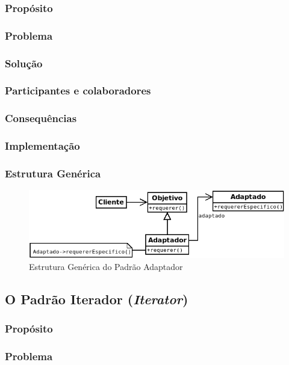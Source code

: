 \subsubsection{Propósito}
\subsubsection{Problema}
\subsubsection{Solução}
\subsubsection{Participantes e colaboradores}
\subsubsection{Consequências}
\subsubsection{Implementação}
\subsubsection{Estrutura Genérica}

\begin{figure}[h]
\begin{center}
\includegraphics[scale=0.6]{dp_adaptador.png}
\caption{Estrutura Genérica do Padrão Adaptador}\label{fig:adaptador}
\end{center}
\end{figure}

\subsection{O Padrão Iterador (\textit{Iterator})}
\subsubsection{Propósito}
\subsubsection{Problema}
